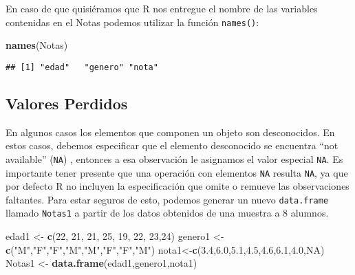 \documentclass[]{book}
\newenvironment{Shaded}{\begin{snugshade}}{\end{snugshade}}
\newcommand{\DecValTok}[1]{\textcolor[rgb]{0.00,0.00,0.81}{#1}}
\newcommand{\FloatTok}[1]{\textcolor[rgb]{0.00,0.00,0.81}{#1}}
\newcommand{\KeywordTok}[1]{\textcolor[rgb]{0.13,0.29,0.53}{\textbf{#1}}}
\newcommand{\NormalTok}[1]{#1}
\newcommand{\OtherTok}[1]{\textcolor[rgb]{0.56,0.35,0.01}{#1}}
\newcommand{\StringTok}[1]{\textcolor[rgb]{0.31,0.60,0.02}{#1}}
\begin{document}
En caso de que quisiéramos que R nos entregue el nombre de las variables contenidas en el Notas podemos
utilizar la función \texttt{names()}:

\begin{Shaded}
\begin{Highlighting}[]
\KeywordTok{names}\NormalTok{(Notas)}
\end{Highlighting}
\end{Shaded}

\begin{verbatim}
## [1] "edad"   "genero" "nota"
\end{verbatim}

\hypertarget{valores-perdidos}{%
\subsection{Valores Perdidos}\label{valores-perdidos}}

En algunos casos los elementos que componen un objeto son desconocidos. En estos casos, debemos
especificar que el elemento desconocido se encuentra ``not available'' (\texttt{NA}) , entonces a esa observación le
asignamos el valor especial \texttt{NA}. Es importante tener presente que una operación con elementos \texttt{NA} resulta
\texttt{NA}, ya que por defecto R no incluyen la especificación que omite o remueve las observaciones faltantes.
Para estar seguros de esto, podemos generar un nuevo \texttt{data.frame} llamado \texttt{Notas1} a partir de los datos
obtenidos de una muestra a 8 alumnos.

\begin{Shaded}
\begin{Highlighting}[]
\NormalTok{edad1 <-}\StringTok{ }\KeywordTok{c}\NormalTok{(}\DecValTok{22}\NormalTok{, }\DecValTok{21}\NormalTok{, }\DecValTok{21}\NormalTok{, }\DecValTok{25}\NormalTok{, }\DecValTok{19}\NormalTok{, }\DecValTok{22}\NormalTok{, }\DecValTok{23}\NormalTok{,}\DecValTok{24}\NormalTok{)}
\NormalTok{genero1 <-}\StringTok{ }\KeywordTok{c}\NormalTok{(}\StringTok{"M"}\NormalTok{,}\StringTok{"F"}\NormalTok{,}\StringTok{"F"}\NormalTok{,}\StringTok{"M"}\NormalTok{,}\StringTok{"M"}\NormalTok{,}\StringTok{"F"}\NormalTok{,}\StringTok{"F"}\NormalTok{,}\StringTok{"M"}\NormalTok{)}
\NormalTok{nota1<-}\KeywordTok{c}\NormalTok{(}\FloatTok{3.4}\NormalTok{,}\FloatTok{6.0}\NormalTok{,}\FloatTok{5.1}\NormalTok{,}\FloatTok{4.5}\NormalTok{,}\FloatTok{4.6}\NormalTok{,}\FloatTok{6.1}\NormalTok{,}\FloatTok{4.0}\NormalTok{,}\OtherTok{NA}\NormalTok{)}
\NormalTok{Notas1 <-}\StringTok{ }\KeywordTok{data.frame}\NormalTok{(edad1,genero1,nota1)}
\end{Highlighting}
\end{Shaded}
\end{document}
